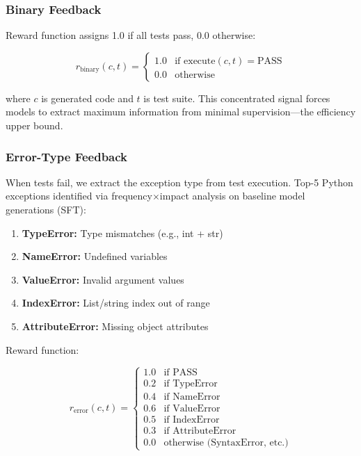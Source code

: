 \subsubsection{Binary Feedback}

Reward function assigns 1.0 if all tests pass, 0.0 otherwise:

\begin{equation}
r_{\text{binary}}(c, t) = \begin{cases} 1.0 & \text{if } \text{execute}(c, t) = \text{PASS} \\ 0.0 & \text{otherwise} \end{cases}
\end{equation}

where $c$ is generated code and $t$ is test suite. This concentrated signal forces models to extract maximum information from minimal supervision---the efficiency upper bound.

\subsubsection{Error-Type Feedback}

When tests fail, we extract the exception type from test execution. Top-5 Python exceptions identified via frequency$\times$impact analysis on baseline model generations (SFT):

\begin{enumerate}
\item \textbf{TypeError:} Type mismatches (e.g., int + str)
\item \textbf{NameError:} Undefined variables
\item \textbf{ValueError:} Invalid argument values
\item \textbf{IndexError:} List/string index out of range
\item \textbf{AttributeError:} Missing object attributes
\end{enumerate}

Reward function:

\begin{equation}
r_{\text{error}}(c, t) = \begin{cases}
1.0 & \text{if PASS} \\
0.2 & \text{if TypeError} \\
0.4 & \text{if NameError} \\
0.6 & \text{if ValueError} \\
0.5 & \text{if IndexError} \\
0.3 & \text{if AttributeError} \\
0.0 & \text{otherwise (SyntaxError, etc.)}
\end{cases}
\end{equation}

